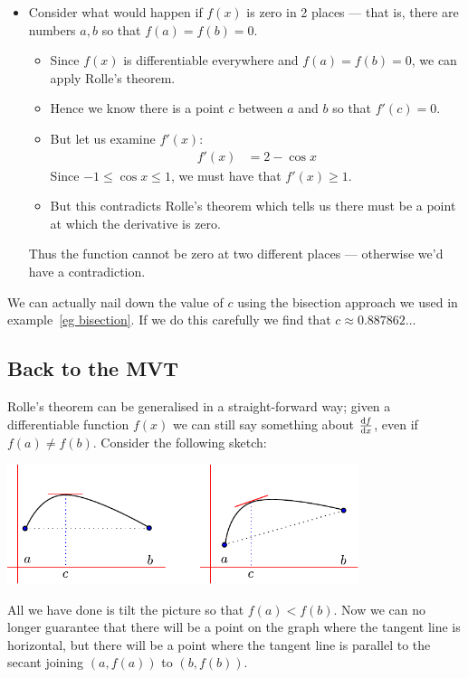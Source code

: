 \begin{eg}
\begin{itemize}
\item Consider what would happen if $f(x)$ is zero in 2 places --- that is, there are
numbers $a,b$ so that $f(a)=f(b)=0$.
\begin{itemize}
 \item Since $f(x)$ is differentiable everywhere and $f(a)=f(b)=0$, we can apply Rolle's
theorem.
\item Hence we know there is a point $c$ between $a$ and $b$ so that $f'(c)=0$.
\item But let us examine $f'(x)$:
\begin{align*}
  f'(x) &= 2- \cos x
\end{align*}
Since $-1\leq \cos x \leq 1$, we must have that $f'(x) \geq 1$.
\item But this contradicts Rolle's theorem which tells us there must be a point at which
the derivative is zero.
\end{itemize}
Thus the function cannot be zero at two different places --- otherwise we'd have a
contradiction.
\end{itemize}
We can actually nail down the value of $c$ using the bisection approach we used in
example~\ref{eg bisection}. If we do this carefully we find that $c \approx
0.887862\dots$

\end{eg}


\subsection*{Back to the MVT}
Rolle's theorem can be generalised in a straight-forward way; given a differentiable
function $f(x)$ we can still say something about $\diff{f}{x}$, even if $f(a) \neq f(b)$.
Consider the following sketch:
\begin{fig}
 \begin{center}
  \includegraphics[height=3.5cm]{extra/rolle_to_mvt}
 \end{center}\label{fig rolle_to_mvt}
\end{fig}
All we have done is tilt the picture so that $f(a) < f (b)$. Now we can no longer
guarantee that there will be a point on the graph where the tangent line is horizontal,
but there will be a point where the tangent line is parallel to the secant joining $(a,
f(a))$ to $(b, f(b))$.

